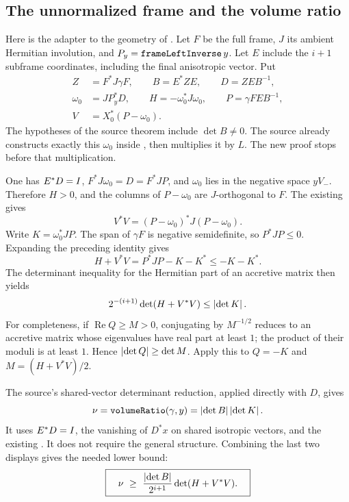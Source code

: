 \subsection{The unnormalized frame and the volume ratio}

Here is the adapter to the geometry of .
Let \(F\) be the full frame, \(J\) its ambient Hermitian involution, and
\(P_y=\code{frameLeftInverse}\,y\). Let \(E\) include the \(i+1\) subframe
coordinates, including the final anisotropic vector. Put
\begin{equation}\label{eq:raw-data}
 \begin{split}
 Z&=F^*J\gamma F,\qquad B=E^*ZE,\qquad D=ZE B^{-1},\\
 \omega_0&=JP_y^*D,\qquad
 H=-\omega_0^*J\omega_0,\qquad
 P=\gamma FE B^{-1},\\
 V&=X_0^*(P-\omega_0).
 \end{split}
\end{equation}
The hypotheses of the source theorem include \(\det B\ne0\).
The source already constructs exactly this \(\omega_0\) inside
, then multiplies it by \(L\). The new proof stops
before that multiplication.

One has \(E^*D=I\), \(F^*J\omega_0=D=F^*JP\), and \(\omega_0\) lies in
the negative space \(yV_-\). Therefore \(H>0\), and the columns of
\(P-\omega_0\) are \(J\)-orthogonal to \(F\).
The existing
 gives
\[
 V^*V=(P-\omega_0)^*J(P-\omega_0).
\]
Write \(K=\omega_0^*JP\). The span of \(\gamma F\) is negative semidefinite,
so \(P^*JP\leq0\). Expanding the preceding identity gives
\begin{equation}\label{eq:hermitian-lower}
 H+V^*V=P^*JP-K-K^*\leq-K-K^*.
\end{equation}
The determinant inequality for the Hermitian part of an accretive matrix then yields
\[
 2^{-(i+1)}\det(H+V^*V)\leq\left|\det K\right|.
\]
For completeness, if \(\operatorname{Re}Q\geq M>0\), conjugating by \(M^{-1/2}\)
reduces to an accretive matrix whose eigenvalues have real part at least \(1\);
the product of their moduli is at least \(1\). Hence
\(\left|\det Q\right|\geq\det M\). Apply this to \(Q=-K\) and
\(M=(H+V^*V)/2\).

The source's shared-vector determinant reduction, applied directly with \(D\),
gives
\[
 \nu=\code{volumeRatio}(\gamma,y)=\abs{\det B}\abs{\det K}.
\]
It uses \(E^*D=I\), the vanishing of \(D^*x\) on shared isotropic vectors,
and the existing
.
It does not require the general  structure.
Combining the last two displays gives the needed lower bound:
\begin{equation}\label{eq:raw-volume}
 \boxed{\quad
 \nu\ \geq\ \frac{\left|\det B\right|}{2^{i+1}}
                   \det(H+V^*V).\quad}
\end{equation}

